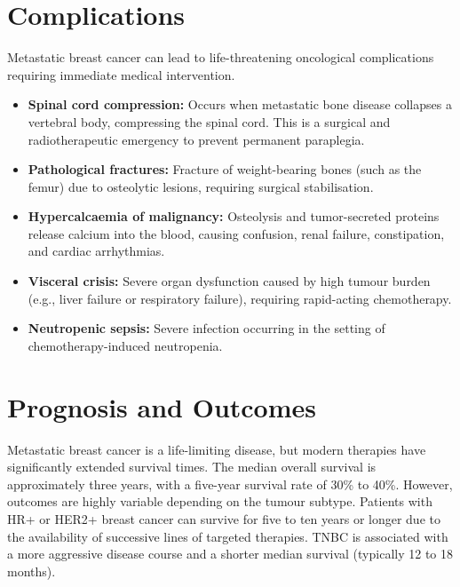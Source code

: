 \section*{Complications}
Metastatic breast cancer can lead to life-threatening oncological complications requiring immediate medical intervention.
\begin{itemize}
    \item \textbf{Spinal cord compression:} Occurs when metastatic bone disease collapses a vertebral body, compressing the spinal cord. This is a surgical and radiotherapeutic emergency to prevent permanent paraplegia.
    \item \textbf{Pathological fractures:} Fracture of weight-bearing bones (such as the femur) due to osteolytic lesions, requiring surgical stabilisation.
    \item \textbf{Hypercalcaemia of malignancy:} Osteolysis and tumor-secreted proteins release calcium into the blood, causing confusion, renal failure, constipation, and cardiac arrhythmias.
    \item \textbf{Visceral crisis:} Severe organ dysfunction caused by high tumour burden (e.g., liver failure or respiratory failure), requiring rapid-acting chemotherapy.
    \item \textbf{Neutropenic sepsis:} Severe infection occurring in the setting of chemotherapy-induced neutropenia.
\end{itemize}

\section*{Prognosis and Outcomes}
Metastatic breast cancer is a life-limiting disease, but modern therapies have significantly extended survival times. The median overall survival is approximately three years, with a five-year survival rate of 30\% to 40\%. However, outcomes are highly variable depending on the tumour subtype. Patients with HR+ or HER2+ breast cancer can survive for five to ten years or longer due to the availability of successive lines of targeted therapies. TNBC is associated with a more aggressive disease course and a shorter median survival (typically 12 to 18 months).

